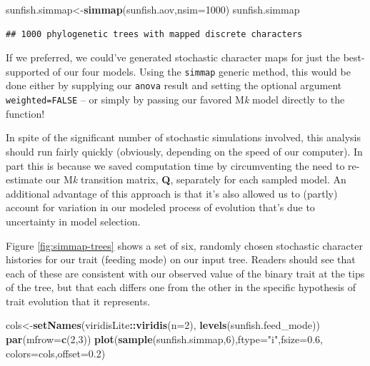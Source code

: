 \documentclass[fleqn,10pt,lineno]{wlpeerj} %
\newenvironment{Shaded}{\begin{snugshade}}{\end{snugshade}}
\newcommand{\AttributeTok}[1]{\textcolor[rgb]{0.13,0.29,0.53}{#1}}
\newcommand{\DecValTok}[1]{\textcolor[rgb]{0.00,0.00,0.81}{#1}}
\newcommand{\FloatTok}[1]{\textcolor[rgb]{0.00,0.00,0.81}{#1}}
\newcommand{\FunctionTok}[1]{\textcolor[rgb]{0.13,0.29,0.53}{\textbf{#1}}}
\newcommand{\NormalTok}[1]{#1}
\newcommand{\OtherTok}[1]{\textcolor[rgb]{0.56,0.35,0.01}{#1}}
\newcommand{\SpecialCharTok}[1]{\textcolor[rgb]{0.81,0.36,0.00}{\textbf{#1}}}
\newcommand{\StringTok}[1]{\textcolor[rgb]{0.31,0.60,0.02}{#1}}
\begin{document}
\begin{Shaded}
\begin{Highlighting}[]
\NormalTok{sunfish.simmap}\OtherTok{\textless{}{-}}\FunctionTok{simmap}\NormalTok{(sunfish.aov,}\AttributeTok{nsim=}\DecValTok{1000}\NormalTok{)}
\NormalTok{sunfish.simmap}
\end{Highlighting}
\end{Shaded}

\begin{verbatim}
## 1000 phylogenetic trees with mapped discrete characters
\end{verbatim}

If we preferred, we could've generated stochastic character maps for just the best-supported of our four models. Using the \texttt{simmap} generic method, this would be done either by supplying our \texttt{anova} result and setting the optional argument \texttt{weighted=FALSE} -- or simply by passing our favored M\emph{k} model directly to the function!

In spite of the significant number of stochastic simulations involved, this analysis should run fairly quickly (obviously, depending on the speed of our computer). In part this is because we saved computation time by circumventing the need to re-estimate our M\emph{k} transition matrix, \textbf{Q}, separately for each sampled model. An additional advantage of this approach is that it's also allowed us to (partly) account for variation in our modeled process of evolution that's due to uncertainty in model selection.

Figure \ref{fig:simmap-trees} shows a set of six, randomly chosen stochastic character histories for our trait (feeding mode) on our input tree. Readers should see that each of these are consistent with our observed value of the binary trait at the tips of the tree, but that each differs one from the other in the specific hypothesis of trait evolution that it represents.

\begin{Shaded}
\begin{Highlighting}[]
\NormalTok{cols}\OtherTok{\textless{}{-}}\FunctionTok{setNames}\NormalTok{(viridisLite}\SpecialCharTok{::}\FunctionTok{viridis}\NormalTok{(}\AttributeTok{n=}\DecValTok{2}\NormalTok{),}
  \FunctionTok{levels}\NormalTok{(sunfish.feed\_mode))}
\FunctionTok{par}\NormalTok{(}\AttributeTok{mfrow=}\FunctionTok{c}\NormalTok{(}\DecValTok{2}\NormalTok{,}\DecValTok{3}\NormalTok{))}
\FunctionTok{plot}\NormalTok{(}\FunctionTok{sample}\NormalTok{(sunfish.simmap,}\DecValTok{6}\NormalTok{),}\AttributeTok{ftype=}\StringTok{"i"}\NormalTok{,}\AttributeTok{fsize=}\FloatTok{0.6}\NormalTok{,}
  \AttributeTok{colors=}\NormalTok{cols,}\AttributeTok{offset=}\FloatTok{0.2}\NormalTok{)}
\end{Highlighting}
\end{Shaded}
\end{document}
